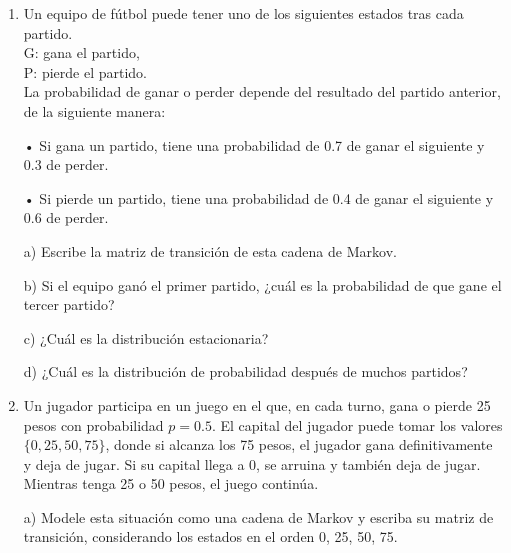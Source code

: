 \documentclass[a4paper, 12pt]{article}
\newcommand{\Aspace}{0.2cm}
\begin{document}
    \begin{enumerate}
        \item Un equipo de fútbol puede tener uno de los siguientes estados tras cada partido. 
        \\G: gana el partido, 
        \\P: pierde el partido. 
        \\La probabilidad de ganar o perder depende del resultado del partido anterior, de la siguiente manera: \par
        • Si gana un partido, tiene una probabilidad de 0.7 de ganar el siguiente y 0.3 de perder. \par
        • Si pierde un partido, tiene una probabilidad de 0.4 de ganar el siguiente y 0.6 de perder.
            \vspace{\Aspace} \par
            a) Escribe la matriz de transición de esta cadena de Markov.
            \\ { \color{azul}  }

            \vspace{\Aspace} \par
            b) Si el equipo ganó el primer partido, ¿cuál es la probabilidad de que gane el tercer partido?
            \\ { \color{azul}  }

            \vspace{\Aspace} \par
            c) ¿Cuál es la distribución estacionaria?
            \\ { \color{azul}  }

            \vspace{\Aspace} \par
            d) ¿Cuál es la distribución de probabilidad después de muchos partidos?
            \\ { \color{azul}  }

        
        \newpage
    \item Un jugador participa en un juego en el que, en cada turno, gana o pierde 25 pesos con probabilidad $p = 0{.}5$. El capital del jugador puede tomar los valores $\{0, 25, 50, 75\}$, donde si alcanza los 75 pesos, el jugador gana definitivamente y deja de jugar. Si su capital llega a 0, se arruina y también deja de jugar. Mientras tenga 25 o 50 pesos, el juego continúa.
            \vspace{\Aspace} \par
            a) Modele esta situación como una cadena de Markov y escriba su matriz de transición, considerando los estados en el orden 0, 25, 50, 75.
            \\ { \color{azul}  }


\end{enumerate}
\end{document}
